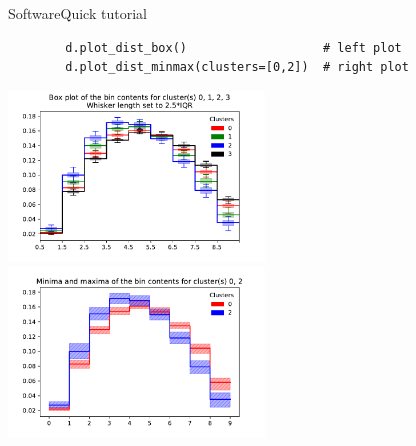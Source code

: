 \begin{frame}[fragile]{Software}{Quick tutorial}
    \begin{verbatim}
        d.plot_dist_box()                   # left plot
        d.plot_dist_minmax(clusters=[0,2])  # right plot
    \end{verbatim}
    
    \bigskip
    \begin{changemargin}{-1.2cm}{-1.2cm}
        \includegraphics[width=6.8cm]{figures/plots/box_plot.pdf}\hspace{-0.5cm}
        \includegraphics[width=6.8cm]{figures/plots/plot_minmax_02.pdf}\\
    \end{changemargin}
\end{frame}
\fi
